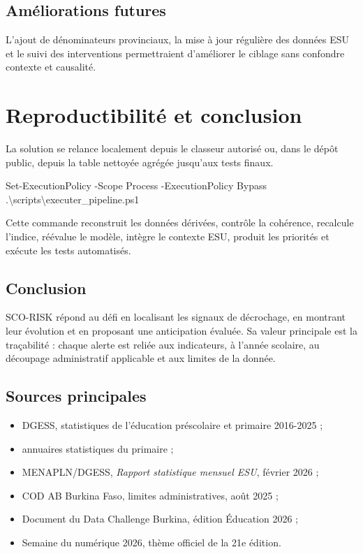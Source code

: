 \documentclass[12pt,a4paper]{article}
\begin{document}
\subsection{Améliorations futures}
L'ajout de dénominateurs provinciaux, la mise à jour régulière des données ESU et le suivi des interventions permettraient d'améliorer le ciblage sans confondre contexte et causalité.
\clearpage
\thispagestyle{fancy}

\section{Reproductibilité et conclusion}
La solution se relance localement depuis le classeur autorisé ou, dans le dépôt public, depuis la table nettoyée agrégée jusqu'aux tests finaux.

\begin{center}
\colorbox{Pale}{\parbox{0.9\textwidth}{\ttfamily
Set-ExecutionPolicy -Scope Process -ExecutionPolicy Bypass\\
.\textbackslash scripts\textbackslash executer\_pipeline.ps1
}}
\end{center}

Cette commande reconstruit les données dérivées, contrôle la cohérence, recalcule l'indice, réévalue le modèle, intègre le contexte ESU, produit les priorités et exécute les tests automatisés.

\subsection{Conclusion}
SCO-RISK répond au défi en localisant les signaux de décrochage, en montrant leur évolution et en proposant une anticipation évaluée. Sa valeur principale est la traçabilité : chaque alerte est reliée aux indicateurs, à l'année scolaire, au découpage administratif applicable et aux limites de la donnée.

\subsection{Sources principales}
\begin{itemize}
  \item DGESS, statistiques de l'éducation préscolaire et primaire 2016-2025 ;
  \item annuaires statistiques du primaire ;
  \item MENAPLN/DGESS, \emph{Rapport statistique mensuel ESU}, février 2026 ;
  \item COD AB Burkina Faso, limites administratives, août 2025 ;
  \item Document du Data Challenge Burkina, édition Éducation 2026 ;
  \item Semaine du numérique 2026, thème officiel de la 21e édition.
\end{itemize}
\end{document}
